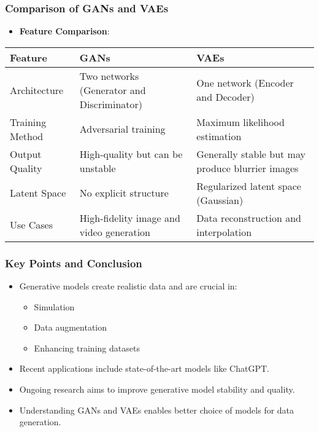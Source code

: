 \documentclass[aspectratio=169]{beamer}
\begin{document}
\begin{frame}[fragile]
    \frametitle{Comparison of GANs and VAEs}
    \begin{itemize}
        \item \textbf{Feature Comparison}:
    \end{itemize}
    \begin{center}
        \begin{tabular}{|l|l|l|}
            \hline
            \textbf{Feature} & \textbf{GANs} & \textbf{VAEs} \\
            \hline
            Architecture & Two networks (Generator and Discriminator) & One network (Encoder and Decoder) \\
            \hline
            Training Method & Adversarial training & Maximum likelihood estimation \\
            \hline
            Output Quality & High-quality but can be unstable & Generally stable but may produce blurrier images \\
            \hline
            Latent Space & No explicit structure & Regularized latent space (Gaussian) \\
            \hline
            Use Cases & High-fidelity image and video generation & Data reconstruction and interpolation \\
            \hline
        \end{tabular}
    \end{center}
\end{frame}

\begin{frame}[fragile]
    \frametitle{Key Points and Conclusion}
    \begin{itemize}
        \item Generative models create realistic data and are crucial in:
        \begin{itemize}
            \item Simulation
            \item Data augmentation
            \item Enhancing training datasets
        \end{itemize}
        \item Recent applications include state-of-the-art models like ChatGPT.
        \item Ongoing research aims to improve generative model stability and quality.
        \item Understanding GANs and VAEs enables better choice of models for data generation.
    \end{itemize}
\end{frame}
\end{document}
